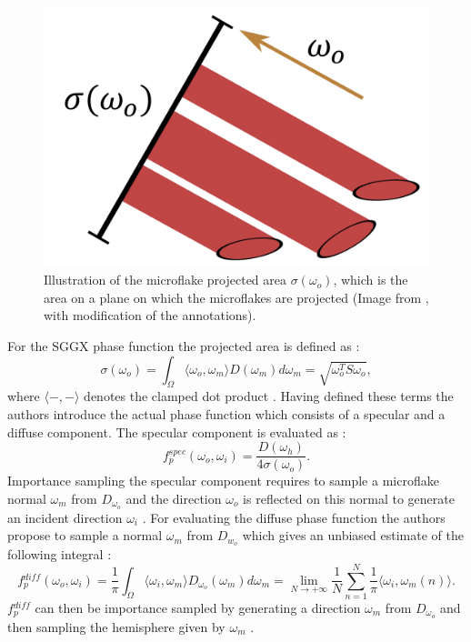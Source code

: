\begin{figure}[ht]
    \centering
    \includegraphics[width=0.3\linewidth]{img/sggx_projected_area.jpg}
    \caption[Illustration of the microflake projected area]{Illustration of the microflake projected area $\sigma(\omega_o)$, which is the area on a plane on which the microflakes are projected (Image from \cite{sggx}, with modification of the annotations).}
    \label{fig:sggx_projected_area}
\end{figure}
For the SGGX phase function the projected area is defined as \cite{sggx}:
\begin{equation}
    \label{eq:projected_area}
    \sigma(\omega_o)=\int_\Omega \langle \omega_o, \omega_m \rangle D(\omega_m) d\omega_m = \sqrt{\omega_o^T S \omega_o},
\end{equation}
where $\langle -,-\rangle$ denotes the clamped dot product \cite{sggx}.
Having defined these terms the authors introduce the actual phase function which consists of a specular and a diffuse component.
The specular component is evaluated as \cite{sggx}:
\begin{equation*}
    f{}^{spec}_p(\omega_o, \omega_i) = \frac{D(\omega_h)}{4 \sigma(\omega_o)}.
\end{equation*}
Importance sampling the specular component requires to sample a microflake normal $\omega_m$ from $D_{\omega_o}$ and the direction $\omega_o$ is reflected on this normal to generate an incident direction $\omega_i$ \cite{sggx}.
For evaluating the diffuse phase function the authors propose to sample a normal $\omega_m$ from $D_{w_o}$ which gives an unbiased estimate of the following integral \cite{sggx}:
\begin{equation*}
    f{}^{diff}_p(\omega_o, \omega_i) = \frac{1}{\pi}\int_\Omega \langle\omega_i,\omega_m\rangle D_{\omega_o}(\omega_m) d\omega_m = \lim \limits_{N \to +\infty} \frac{1}{N} \sum_{n=1}^N \frac{1}{\pi} \langle\omega_i,\omega_m(n)\rangle.
\end{equation*}
$f{}^{diff}_p$ can then be importance sampled by generating a direction $\omega_m$ from $D_{\omega_o}$ and then sampling the hemisphere given by $\omega_m$ \cite{sggx}.

